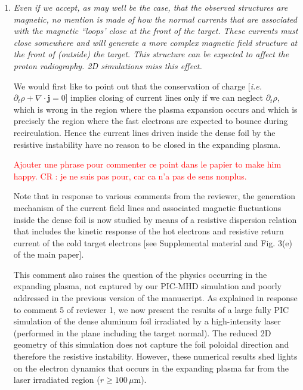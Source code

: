 \documentclass[aps,showpacs,superscriptaddress]{revtex4}%
\begin{document}
\begin{enumerate}
\item \textit{Even if we accept, as may well be the case, that the observed structures are magnetic, no mention is made of how the normal currents that are associated with the magnetic ``loops' close at the front of the target. These currents must close somewhere and will generate a more complex magnetic field structure at the front of (outside) the target. This structure can be expected to affect the proton radiography. 2D simulations miss this effect.}

We would first like to point out that the conservation of charge [\emph{i.e.} $\partial_t \rho+\nabla \cdot \mathbf{j}=0$] implies closing of current lines only if we can neglect $\partial_t \rho$, which is  wrong in the region  where the plasma expansion occurs and which is precisely  the region where the fast electrons are expected to bounce during recirculation.
Hence  the current lines  driven inside the dense foil by the resistive instability have no reason to be closed in the expanding plasma.

\textcolor{red}{
Ajouter une phrase pour commenter ce point dans le papier to make him happy.
CR :  je ne suis pas pour, car ca n'a pas de sens nonplus.
}

Note that in response to various comments from the reviewer,  the generation mechanism of the current field lines and associated magnetic fluctuations inside the dense foil is now studied by means of a resistive dispersion relation that includes the kinetic response of the hot electrons and resistive return current of the cold target electrons [see Supplemental material and Fig. 3(e) of the main paper]. 

This comment also raises the question of the physics occurring in the expanding plasma,  not captured by our PIC-MHD simulation and poorly addressed in the previous version of the manuscript.
As explained in response to comment 5 of reviewer 1, 
we now present the results of a large fully PIC simulation of the dense aluminum foil irradiated by a high-intensity laser (performed in the plane including the target normal). 
The reduced 2D geometry of this simulation does not  capture the foil poloidal direction and therefore the resistive instability. 
However, these numerical results shed lights on the electron dynamics that occurs in the expanding plasma far from the laser irradiated region ($r \ge 100 \, \mu$m).


\end{enumerate}
\end{document}
